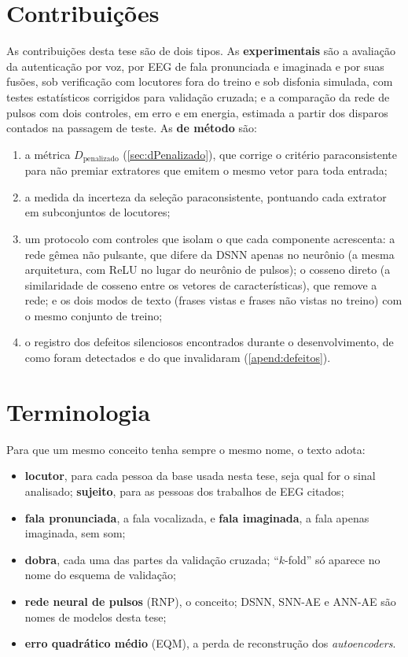 	\section{Contribuições}

		\par As contribuições desta tese são de dois tipos. As \textbf{experimentais} são a avaliação da autenticação por voz, por \ac{EEG} de fala pronunciada e imaginada e por suas fusões, sob verificação com locutores fora do treino e sob disfonia simulada, com testes estatísticos corrigidos para validação cruzada; e a comparação da rede de pulsos com dois controles, em erro e em energia, estimada a partir dos disparos contados na passagem de teste. As \textbf{de método} são:
		\begin{enumerate}
			\item a métrica $D_{\text{penalizado}}$ (\autoref{sec:dPenalizado}), que corrige o critério paraconsistente para não premiar extratores que emitem o mesmo vetor para toda entrada;
			\item a medida da incerteza da seleção paraconsistente, pontuando cada extrator em subconjuntos de locutores;
			\item um protocolo com controles que isolam o que cada componente acrescenta: a rede gêmea não pulsante, que difere da \ac{DSNN} apenas no neurônio (a mesma arquitetura, com ReLU no lugar do neurônio de pulsos); o cosseno direto (a similaridade de cosseno entre os vetores de características), que remove a rede; e os dois modos de texto (frases vistas e frases não vistas no treino) com o mesmo conjunto de treino;
			\item o registro dos defeitos silenciosos encontrados durante o desenvolvimento, de como foram detectados e do que invalidaram (\autoref{apend:defeitos}).
		\end{enumerate}

	\section{Terminologia}

		\par Para que um mesmo conceito tenha sempre o mesmo nome, o texto adota:
		\begin{itemize}
			\item \textbf{locutor}, para cada pessoa da base usada nesta tese, seja qual for o sinal analisado; \textbf{sujeito}, para as pessoas dos trabalhos de \ac{EEG} citados;
			\item \textbf{fala pronunciada}, a fala vocalizada, e \textbf{fala imaginada}, a fala apenas imaginada, sem som;
			\item \textbf{dobra}, cada uma das partes da validação cruzada; ``$k$-fold'' só aparece no nome do esquema de validação;
			\item \textbf{rede neural de pulsos} (\ac{RNP}), o conceito; DSNN, \ac{SNN}-AE e \ac{ANN}-AE são nomes de modelos desta tese;
			\item \textbf{erro quadrático médio} (EQM), a perda de reconstrução dos \textit{autoencoders}.
		\end{itemize}

